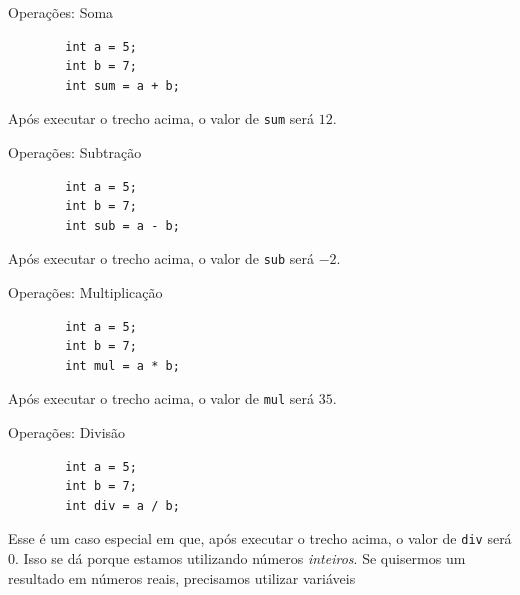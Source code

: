 \documentclass{beamer}
\begin{document}
\begin{frame}[fragile]{Operações: Soma}
    \begin{verbatim}
        int a = 5;
        int b = 7;
        int sum = a + b;
    \end{verbatim}

    Após executar o trecho acima, o valor de \texttt{sum} será $12$.
\end{frame}

\begin{frame}[fragile]{Operações: Subtração}
    \begin{verbatim}
        int a = 5;
        int b = 7;
        int sub = a - b;
    \end{verbatim}

    Após executar o trecho acima, o valor de \texttt{sub} será $-2$.
\end{frame}

\begin{frame}[fragile]{Operações: Multiplicação}
    \begin{verbatim}
        int a = 5;
        int b = 7;
        int mul = a * b;
    \end{verbatim}

    Após executar o trecho acima, o valor de \texttt{mul} será $35$.
\end{frame}

\begin{frame}[fragile]{Operações: Divisão}
    \begin{verbatim}
        int a = 5;
        int b = 7;
        int div = a / b;
    \end{verbatim}

    Esse é um caso especial em que, após executar o trecho acima, o valor de
    \texttt{div} será $0$. Isso se dá porque estamos utilizando números
    \emph{inteiros}. Se quisermos um resultado em números reais, precisamos utilizar variáveis
\end{frame}
\end{document}
